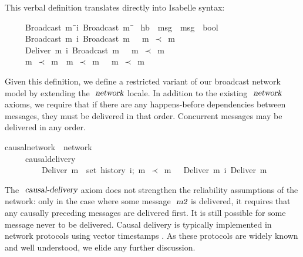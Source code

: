 This verbal definition translates directly into Isabelle syntax:
\begin{isabelle}
~~~~{\isachardoublequoteopen}{\isasymlbrakk}\ Broadcast\ m{}\ \={\isasymsqsubset}\isactrlsup i\ Broadcast\ m{}\ \=\kill
{}\ hb\ {\isacharcolon}{\isacharcolon}\ {\isachardoublequoteopen}{\isacharprime}msg\ {\isasymRightarrow}\ {\isacharprime}msg\ {\isasymRightarrow}\ bool{\isachardoublequoteclose}\ \\
~~~~{\isachardoublequoteopen}{\isasymlbrakk}\ Broadcast\ m{}\ \>{\isasymsqsubset}\isactrlsup i\ Broadcast\ m{}\ \>{\isasymrbrakk}\ {\isasymLongrightarrow}\ m{}\ $\prec$\ m{}{\isachardoublequoteclose}\ {\isacharbar}\\
~~~~{\isachardoublequoteopen}{\isasymlbrakk}\ Deliver\ m{}\ \>{\isasymsqsubset}\isactrlsup i\ Broadcast\ m{}\ \>{\isasymrbrakk}\ {\isasymLongrightarrow}\ m{}\ $\prec$\ m{}{\isachardoublequoteclose}\ {\isacharbar}\\
~~~~{\isachardoublequoteopen}{\isasymlbrakk}\ m{}\ $\prec$\  m{}{\isacharsemicolon}\ \ m{}\ $\prec$\ m{}\ \>\>{\isasymrbrakk}\ {\isasymLongrightarrow}\ m{}\ $\prec$\ m{}{\isachardoublequoteclose}
\end{isabelle}
Given this definition, we define a restricted variant of our broadcast network model by extending the $\isa{network}$ locale.
In addition to the existing $\isa{network}$ axioms, we require that if there are any happens-before dependencies between messages, they must be delivered in that order.
Concurrent messages may be delivered in any order.
\begin{isabelle}
 causal{\isacharunderscore}network\ {\isacharequal}\ network\ {\isacharplus}\\
~~~~\ causal{\isacharunderscore}delivery{\isacharcolon}\\
~~~~~~~~{\isasymlbrakk}\ {\isachardoublequoteopen}Deliver\ m{}\ {\isasymin}\ set\ {\isacharparenleft}history\ i{\isacharparenright};\ m{}\ $\prec$\ m{}\ {\isasymrbrakk}\ {\isasymLongrightarrow}\ Deliver\ m{}\ {\isasymsqsubset}\isactrlsup i\ Deliver\ m{}{\isachardoublequoteclose}
\end{isabelle}
The $\isa{causal-delivery}$ axiom does not strengthen the reliability assumptions of the network: only in the case where some message $\isa{m2}$ is delivered, it requires that any causally preceding messages are delivered first.
It is still possible for some message never to be delivered.
Causal delivery is typically implemented in network protocols using vector timestamps \cite{Schwarz:1994gl,Fidge:1988tv,Raynal:1996jl}.
As these protocols are widely known and well understood, we elide any further discussion.

